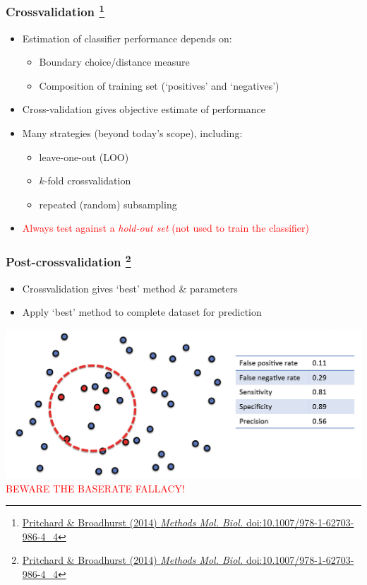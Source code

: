 \begin{frame}
  \frametitle{Crossvalidation
    \footnote{\tiny{\href{http://dx.doi.org/10.1007/978-1-62703-986-4_4}{Pritchard \& Broadhurst (2014) \textit{Methods Mol. Biol.} doi:10.1007/978-1-62703-986-4\_4}}}
}
      \begin{itemize}  
        \item \textcolor{hutton_green}{Estimation of classifier performance depends on:}
          \begin{itemize}
            \item Boundary choice/distance measure
            \item Composition of training set (`positives' and `negatives')
          \end{itemize}
        \item \textcolor{hutton_blue}{Cross-validation gives objective estimate of performance}
        \item \textcolor{hutton_purple}{Many strategies (beyond today's scope), including:}
          \begin{itemize}
            \item leave-one-out (LOO)
            \item $k$-fold crossvalidation
            \item repeated (random) subsampling
          \end{itemize}
        \item \textcolor{red}{Always test against a \textit{hold-out set} (not used to train the classifier)}
        \end{itemize}          
\end{frame}

\begin{frame}
  \frametitle{Post-crossvalidation
  \footnote{\tiny{\href{http://dx.doi.org/10.1007/978-1-62703-986-4_4}{Pritchard \& Broadhurst (2014) \textit{Methods Mol. Biol.} doi:10.1007/978-1-62703-986-4\_4}}}
}
  \begin{itemize}
    \item \textcolor{hutton_green}{Crossvalidation gives `best' method \& parameters}
    \item \textcolor{hutton_purple}{Apply `best' method to complete dataset for prediction}
  \end{itemize}
  \includegraphics[width=1\textwidth]{images/finding_effectors12}    \\
  \textcolor{red}{BEWARE THE BASERATE FALLACY!}
\end{frame}

